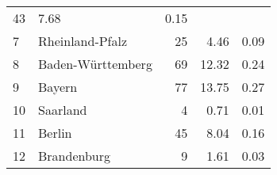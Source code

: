 \begin{longtable}{lXrrr}
       \num{43} &
       \num[round-mode=places,round-precision=2]{7,68} &
         \num[round-mode=places,round-precision=2]{0,15} \\

     7 &
     \multicolumn{1}{X}{ Rheinland-Pfalz   } &


       \num{25} &
       \num[round-mode=places,round-precision=2]{4,46} &
         \num[round-mode=places,round-precision=2]{0,09} \\

     8 &
     \multicolumn{1}{X}{ Baden-Württemberg   } &


       \num{69} &
       \num[round-mode=places,round-precision=2]{12,32} &
         \num[round-mode=places,round-precision=2]{0,24} \\

     9 &
     \multicolumn{1}{X}{ Bayern   } &


       \num{77} &
       \num[round-mode=places,round-precision=2]{13,75} &
         \num[round-mode=places,round-precision=2]{0,27} \\

     10 &
     \multicolumn{1}{X}{ Saarland   } &


       \num{4} &
       \num[round-mode=places,round-precision=2]{0,71} &
         \num[round-mode=places,round-precision=2]{0,01} \\

     11 &
     \multicolumn{1}{X}{ Berlin   } &


       \num{45} &
       \num[round-mode=places,round-precision=2]{8,04} &
         \num[round-mode=places,round-precision=2]{0,16} \\

     12 &
     \multicolumn{1}{X}{ Brandenburg   } &


       \num{9} &
       \num[round-mode=places,round-precision=2]{1,61} &
         \num[round-mode=places,round-precision=2]{0,03} \\


\end{longtable}
